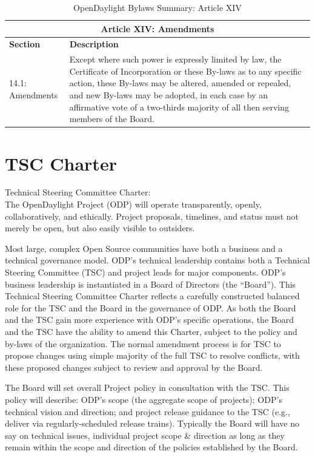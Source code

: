 \documentclass[a4paper, 12pt]{book}
\begin{document}
{\begin{table}[H]
  \begin{center}
    \begin{tabular}{ | p{3cm} | p{12cm} | }
    \toprule
    \multicolumn {2}{|c|}{\textbf{Article XIV: Amendments}} \\
    \hline
    \textbf{Section} & \textbf{Description} \\
    \hline
    14.1: Amendments & Except where such power is expressly limited by law, the Certificate of Incorporation or these By-laws as to any specific action, these By-laws may be altered, amended or repealed, and new By-laws may be adopted, in each case by an affirmative vote of a two-thirds majority of all then serving members of the Board.\\
    \bottomrule
    \end{tabular}
    \caption{OpenDaylight Bylaws Summary: Article XIV}
    \label{tab:odlbylaws-art14}
  \end{center}
\end{table}

\chapter{TSC Charter}
\label{chap:appendix_tsccharter}
Technical Steering Committee Charter:\\
The OpenDaylight Project (ODP) will operate transparently, openly, collaboratively, and ethically.  Project proposals, timelines, and status must not merely be open, but also easily visible to outsiders.

Most large, complex Open Source communities have both a business and a technical governance model.  ODP's technical leadership contains both a Technical Steering Committee (TSC) and project leads for major components.  ODP's business leadership is instantiated in a Board of Directors (the “Board”).  This Technical Steering Committee Charter reflects a carefully constructed balanced role for the TSC and the Board in the governance of ODP.  As both the Board and the TSC gain more experience with ODP’s specific operations, the Board and the TSC have the ability to amend this Charter, subject to the policy and by-laws of the organization.  The normal amendment process is for TSC to propose changes using simple majority of the full TSC to resolve conflicts, with these proposed changes subject to review and approval by the Board.

The Board will set overall Project policy in consultation with the TSC.   This policy will describe:  ODP's scope (the aggregate scope of projects); ODP’s technical vision and direction; and project release guidance to the TSC (e.g., deliver via regularly-scheduled release trains).   Typically the Board will have no say on technical issues, individual project scope \& direction as long as they remain within the scope and direction of the policies established by the Board.

}
\end{document}
